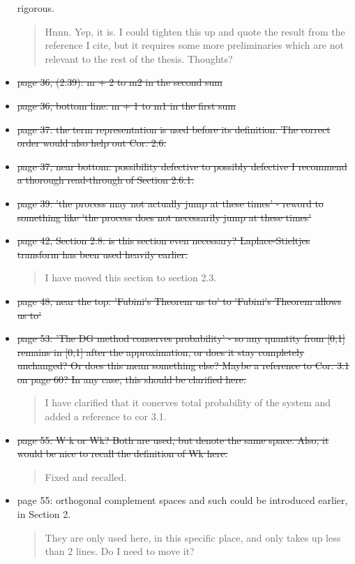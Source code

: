 \documentclass[a4paper]{article}
\begin{document}
\begin{itemize}
rigorous.
\begin{quote}
    Hnnn. Yep, it is. I could tighten this up and quote the result from the reference I cite, but it requires some more preliminaries which are not relevant to the rest of the thesis. Thoughts? 
\end{quote}
\item \st{page 36, (2.39): m + 2 to m2 in the second sum}
\item \st{page 36, bottom line: m + 1 to m1 in the first sum}
\item \st{page 37: the term representation is used before its definition. The correct order
would also help out Cor. 2.6.}
\item \st{page 37, near bottom: possibility defective to possibly defective I recommend a
thorough read-through of Section 2.6.1.}
\item \st{page 39: 'the process may not actually jump at these times' - reword to something
like 'the process does not necessarily jump at these times'}
\item \st{page 42, Section 2.8: is this section even necessary? Laplace-Stieltjes transform has been used heavily earlier.}
\begin{quote}
    I have moved this section to section 2.3.
\end{quote}
\item \st{page 48, near the top: 'Fubini's Theorem us to' to 'Fubini's Theorem allows us to'}
\item \st{page 53: 'The DG method conserves probability' - so any quantity from [0,1] remains
in [0,1] after the approximation, or does it stay completely unchanged? Or does this
mean something else? Maybe a reference to Cor. 3.1 on page 60? In any case, this
should be clarified here.}
\begin{quote}
    I have clarified that it conerves total probability of the system and added a reference to cor 3.1.
\end{quote}
\item \st{page 55: W k or Wk? Both are used, but denote the same space. Also, it would be
nice to recall the definition of Wk here.}
\begin{quote}
    Fixed and recalled.
\end{quote}
\item page 55: orthogonal complement spaces and such could be introduced earlier, in
Section 2.
\begin{quote}
    They are only used here, in this specific place, and only takes up less than 2 lines. Do I need to move it?

\end{quote}
\end{itemize}
\end{document}
